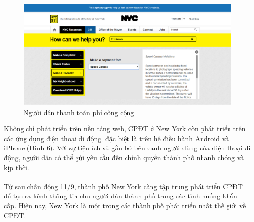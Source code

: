 \documentclass[a4paper]{article}
\begin{document}
\newpage
\begin{center}
    \begin{figure}[h]
    \begin{center}
     \includegraphics[scale=.4]{newyork_payment.PNG}
    \end{center}
    \caption{Người dân thanh toán phí công cộng}
    \label{refhinh2}
    \end{figure}
\end{center}
Không chỉ phát triển trên nền tảng web, CPĐT ở New York còn phát triển trên các ứng dụng điện thoại di động, đặc biệt là trên hệ điều hành Android và iPhone (Hình 6). Với sự tiện ích và gắn bó bên cạnh người dùng của điện thoại di động, người dân có thể gửi yêu cầu đến chính quyền thành phố nhanh chóng và kịp thời.\\
\\
Từ sau chấn động 11/9, thành phố New York càng tập trung phát triển CPĐT để tạo ra kênh thông tin cho người dân thành phố trong các tình huống khẩn cấp. Hiện nay, New York là một trong các thành phố phát triển nhất thế giới về CPĐT.
\end{document}
